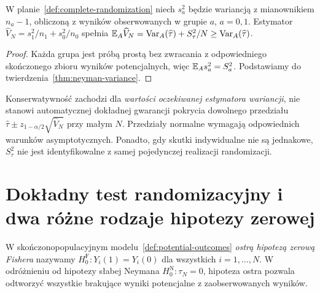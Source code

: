 \begin{wniosek}\label{cor:neyman-se}
W planie~\ref{def:complete-randomization} niech $s_a^2$ będzie wariancją z mianownikiem $n_a-1$, obliczoną z wyników obserwowanych w grupie $a$, $a=0,1$. Estymator
$\widehat V_N=s_1^2/n_1+s_0^2/n_0$ spełnia $\mathbb E_A\widehat V_N=\operatorname{Var}_A(\widehat\tau)+S_\tau^2/N\ge\operatorname{Var}_A(\widehat\tau)$.
\end{wniosek}
\begin{proof}
Każda grupa jest próbą prostą bez zwracania z odpowiedniego skończonego zbioru wyników potencjalnych, więc $\mathbb E_As_a^2=S_a^2$. Podstawiamy do twierdzenia~\ref{thm:neyman-variance}.
\end{proof}

\begin{uwaga}
Konserwatywność zachodzi dla \emph{wartości oczekiwanej estymatora wariancji}, nie stanowi automatycznej dokładnej gwarancji pokrycia dowolnego przedziału $\widehat\tau\pm z_{1-\alpha/2}\sqrt{\widehat V_N}$ przy małym $N$. Przedziały normalne wymagają odpowiednich warunków asymptotycznych. Ponadto, gdy skutki indywidualne nie są jednakowe, $S_\tau^2$ nie jest identyfikowalne z samej pojedynczej realizacji randomizacji.
\end{uwaga}

\section{Dokładny test randomizacyjny i dwa różne rodzaje hipotezy zerowej}
\begin{definicja}\label{def:fisher-sharp}
W skończonopopulacyjnym modelu~\ref{def:potential-outcomes} \emph{ostrą hipotezą zerową Fishera} nazywamy $H_0^{\mathrm F}:Y_i(1)=Y_i(0)$ dla wszystkich $i=1,\ldots,N$. W odróżnieniu od hipotezy słabej Neymana $H_0^{\mathrm N}:\tau_N=0$, hipoteza ostra pozwala odtworzyć wszystkie brakujące wyniki potencjalne z zaobserwowanych wyników.
\end{definicja}


